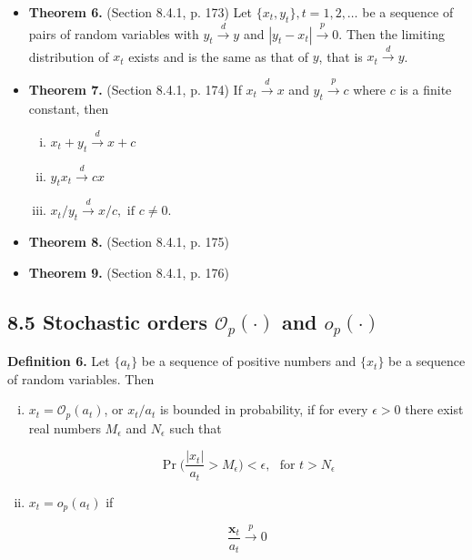 \documentclass{article}
\begin{document}
\begin{itemize}

\item \textbf{Theorem 6.} (Section 8.4.1, p. 173) Let \( \{x_t, y_t\}, t = 1, 2, \ldots\) be a sequence of pairs of random variables with \(y_t \xrightarrow{d} y\) and \(\left| y_t - x_t \right| \xrightarrow{p}  0\). Then the limiting distribution of \(x_t\) exists and is the same as that of \(y\), that is \(x_t \xrightarrow{d} y\).

\item \textbf{Theorem 7.} (Section 8.4.1, p. 174)  If \(x_t \xrightarrow{d} x\) and \(y_t \xrightarrow{p} c\) where \(c\) is a finite constant, then

\begin{enumerate}[(i)]

\item \(x_t + y_t \xrightarrow{d} x + c\)

\item \(y_tx_t \xrightarrow{d} cx\)

\item \(x_t/y_t \xrightarrow{d}  x/c, \text{ if } c \neq 0\).

\end{enumerate}

\item \textbf{Theorem 8.} (Section 8.4.1, p. 175) 

\item \textbf{Theorem 9.} (Section 8.4.1, p. 176) 

\end{itemize}

\subsection{8.5 Stochastic orders \(\mathcal{O}_p(\cdot)\) and \(o_p(\cdot)\)}

\textbf{Definition 6.} Let \(\{a_t\}\) be a sequence of positive numbers and \(\{x_t\}\) be a sequence of random variables. Then

\begin{enumerate}[(i)]

\item \(x_t = \mathcal{O}_p(a_t)\), or \(x_t/a_t\) is bounded in probability, if for every \(\epsilon > 0\) there exist real numbers \(M_\epsilon\) and \(N_\epsilon\) such that

\[
\Pr \bigg( \frac{|x_t|}{a_t} > M_\epsilon \bigg) < \epsilon, \ \ \ \text{for } t > N_\epsilon
\]

\item \(x_t = o_p(a_t)\) if

\[
\frac{\boldsymbol{x}_t}{a_t} \xrightarrow{p} 0
\]

\end{enumerate}
\end{document}

